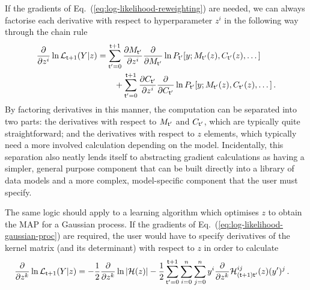 If the gradients of Eq.~(\ref{eq:log-likelihood-reweighting}) are needed, we can always factorise each derivative with respect to hyperparameter $z^i$ in the following way through the chain rule
\begin{align}
\frac{\partial}{\partial z^i}\ln {\cal L}_{{\sf t}+1}(Y \vert z) &= \sum_{{\sf t}'=0}^{{\sf t}+1}\frac{\partial M_{{\sf t}'}}{\partial z^i}\frac{\partial}{\partial M_{{\sf t}'}}\ln P_{{\sf t}'}[y;M_{{\sf t}'}(z),C_{{\sf t}'}(z),\dots ] \nonumber \\
&\qquad + \sum_{{\sf t}'=0}^{{\sf t}+1}\frac{\partial C_{{\sf t}'}}{\partial z^i}\frac{\partial }{\partial C_{{\sf t}'}}\ln P_{{\sf t}'}[y;M_{{\sf t}'}(z),C_{{\sf t}'}(z),\dots ] \,. \label{eq:log-likelihood-reweighting-grad}
\end{align}
By factoring derivatives in this manner, the computation can be separated into two parts: the derivatives with respect to $M_{{\sf t}'}$ and $C_{{\sf t}'}$, which are typically quite straightforward; and the derivatives with respect to $z$ elements, which typically need a more involved calculation depending on the model. Incidentally, this separation also neatly lends itself to abstracting gradient calculations as having a simpler, general purpose component that can be built directly into a library of data models and a more complex, model-specific component that the user must specify.

The same logic should apply to a learning algorithm which optimises $z$ to obtain the MAP for a Gaussian process. If the gradients of Eq.~(\ref{eq:log-likelihood-gaussian-proc}) are required, the user would have to specify derivatives of the kernel matrix (and its determinant) with respect to $z$ in order to calculate
\begin{align}
\frac{\partial}{\partial z^k}\ln {\cal L}_{{\sf t}+1}(Y \vert z) &= -\frac{1}{2}\frac{\partial}{\partial z^k}\ln \vert {\cal H}(z)\vert - \frac{1}{2}\sum_{{\sf t}'=0}^{{\sf t}+1}\sum_{i=0}^{n}\sum_{j=0}^{n} y^i \frac{\partial}{\partial z^k}{\cal H}^{ij}_{({\sf t}+1){\sf t}'}(z) (y')^j \,. \label{eq:log-likelihood-gaussian-proc-grad}
\end{align}


    